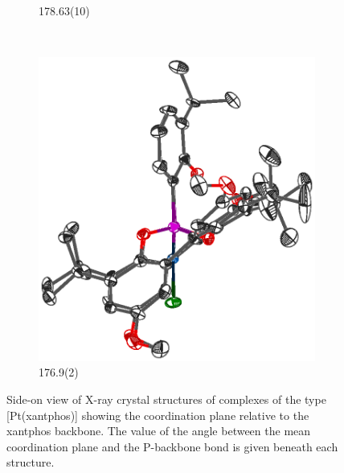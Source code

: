 \begin{figure}[htbp]
\begin{subfigure}[b]{0.4\textwidth}
                \caption{178.63(10)\degrees{}\cite{Mora2008}}
                \label{PtCl2NHCside}
        \end{subfigure}
        ~
        \begin{subfigure}[b]{0.4\textwidth}
                \includegraphics[width=\textwidth]{../Othercrystals/PtCl2/220613side.eps}
                \caption{176.9(2)\degrees{}\cite{Vlugt2003}}
                \label{PtCl2side}
        \end{subfigure}
        \caption[Side-on view of X-ray crystal structures of complexes of the type [Pt(xantphos){]}]{Side-on view of X-ray crystal structures of complexes of the type [Pt(xantphos)] showing the coordination plane relative to the xantphos backbone. The value of the angle between the mean coordination plane and the P-backbone bond is given beneath each structure.}
        \label{crystal:otherPtCl2side}
\end{figure}

